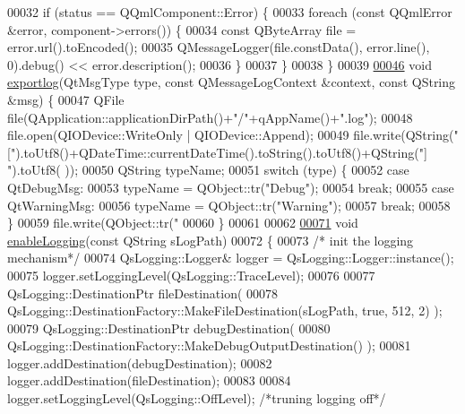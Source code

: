 \begin{DoxyCode}
00032     \textcolor{keywordflow}{if} (status == QQmlComponent::Error) \{
00033         \textcolor{keywordflow}{foreach} (\textcolor{keyword}{const} QQmlError &error, component->errors()) \{
00034             \textcolor{keyword}{const} QByteArray file = error.url().toEncoded();
00035             QMessageLogger(file.constData(), error.line(), 0).debug() << error.description();
00036         \}
00037     \}
00038 \}
00039 
\hypertarget{main_8cpp_source_l00046}{}\hyperlink{main_8cpp_a5e94203dceafb66df570cbbc79cb52bc}{00046} \textcolor{keywordtype}{void} \hyperlink{main_8cpp_a5e94203dceafb66df570cbbc79cb52bc}{exportlog}(QtMsgType type, \textcolor{keyword}{const} QMessageLogContext &context, \textcolor{keyword}{const} QString &msg) \{
00047     QFile file(QApplication::applicationDirPath()+\textcolor{stringliteral}{"/"}+qAppName()+\textcolor{stringliteral}{".log"});
00048     file.open(QIODevice::WriteOnly | QIODevice::Append);
00049     file.write(QString(\textcolor{stringliteral}{"["}).toUtf8()+QDateTime::currentDateTime().toString().toUtf8()+QString(\textcolor{stringliteral}{"] "}).toUtf8(
      ));
00050     QString typeName;
00051     \textcolor{keywordflow}{switch} (type) \{
00052     \textcolor{keywordflow}{case} QtDebugMsg:
00053         typeName = QObject::tr(\textcolor{stringliteral}{"Debug"});
00054         \textcolor{keywordflow}{break};
00055     \textcolor{keywordflow}{case} QtWarningMsg:
00056         typeName = QObject::tr(\textcolor{stringliteral}{"Warning"});
00057         \textcolor{keywordflow}{break};
00058     \}
00059     file.write(QObject::tr(\textcolor{stringliteral}{"%
00060 \}
00061 
00062 
\hypertarget{main_8cpp_source_l00071}{}\hyperlink{main_8cpp_ac3c79e35c4fc5c50939ae90485e1483f}{00071} \textcolor{keywordtype}{void} \hyperlink{main_8cpp_ac3c79e35c4fc5c50939ae90485e1483f}{enableLogging}(\textcolor{keyword}{const} QString sLogPath)
00072 \{
00073     \textcolor{comment}{/* init the logging mechanism*/}
00074     QsLogging::Logger& logger = QsLogging::Logger::instance();
00075     logger.setLoggingLevel(QsLogging::TraceLevel);
00076 
00077     QsLogging::DestinationPtr fileDestination(
00078                 QsLogging::DestinationFactory::MakeFileDestination(sLogPath, \textcolor{keyword}{true}, 512, 2) );
00079     QsLogging::DestinationPtr debugDestination(
00080                 QsLogging::DestinationFactory::MakeDebugOutputDestination() );
00081     logger.addDestination(debugDestination);
00082     logger.addDestination(fileDestination);
00083 
00084     logger.setLoggingLevel(QsLogging::OffLevel); \textcolor{comment}{/*truning logging off*/}
}
\end{DoxyCode}
